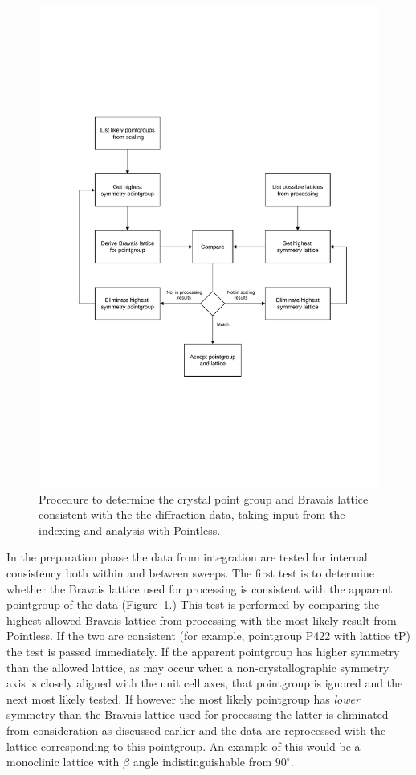 \documentclass[preprint,pdf]{iucr}
\begin{document}
\begin{figure}
\caption{Procedure to determine the crystal point group and Bravais
  lattice consistent with the the diffraction data, taking input from
  the indexing and analysis with Pointless.
\label{figure:scaling_1}}
\centering
\includegraphics[scale=0.5]{figures/scaling-step-1.pdf}
\end{figure}

In the preparation phase the data from integration are tested for
internal consistency both within and between sweeps. The first test is
to determine whether the Bravais lattice used for processing is
consistent with the apparent pointgroup of the data
(Figure~\ref{figure:scaling_1}.)
This test is performed by comparing the highest allowed Bravais
lattice from processing with the most likely result from Pointless. If
the two are consistent (for example, pointgroup P422 with lattice tP)
the test is passed immediately. If the apparent pointgroup has higher
symmetry than the allowed lattice, as may occur when a
non-crystallographic symmetry axis is closely aligned with the unit cell
axes, that pointgroup is ignored and the next most likely tested. If
however the most likely pointgroup has \emph{lower} symmetry than the
Bravais lattice used for processing the latter is eliminated from
consideration as discussed earlier and the data are reprocessed with
the lattice corresponding to this pointgroup. An example of this would
be a monoclinic lattice with $\beta$ angle indistinguishable
from $90^{\circ}$. 
\end{document}
